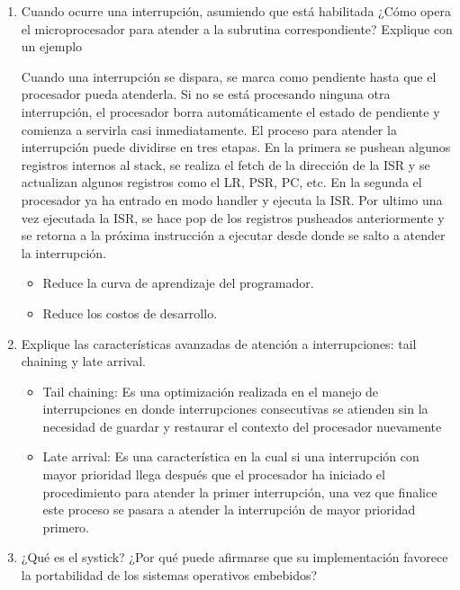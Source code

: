 \documentclass[12pt, a4paper]{article}
\makeatletter
\newcommand\setItemnumber[1]{\setcounter{enum\romannumeral\@enumdepth}{\numexpr#1-1\relax}}
\makeatother
\begin{document}
\begin{enumerate}
    \setItemnumber{15}
    \item Cuando ocurre una interrupción, asumiendo que está habilitada ¿Cómo opera el 
    microprocesador para atender a la subrutina correspondiente? Explique con un ejemplo
    
    Cuando una interrupción se dispara, se marca como pendiente hasta que el procesador pueda atenderla. 
    Si no se está procesando ninguna otra interrupción, el procesador borra automáticamente el estado 
    de pendiente y comienza a servirla casi inmediatamente. El proceso para atender la interrupción puede
    dividirse en tres etapas. En la primera se pushean algunos registros internos al stack, se realiza el 
    fetch de la dirección de la ISR y se actualizan algunos registros como el LR, PSR, PC, etc. En la segunda 
    el procesador ya  ha entrado en modo handler y ejecuta la ISR. Por ultimo una vez ejecutada la ISR, 
    se hace pop de los registros pusheados anteriormente y se retorna a la próxima instrucción a ejecutar desde 
    donde se salto a atender la interrupción.
    
    \begin{itemize}
        \item Reduce la curva de aprendizaje del programador.
        \item Reduce los costos de desarrollo.
    \end{itemize}
    
    \setItemnumber{16}
    \item Explique las características avanzadas de atención a interrupciones: tail chaining y late
    arrival.
    
    \begin{itemize}
        \item Tail chaining: Es una optimización realizada en el manejo de interrupciones en donde 
        interrupciones consecutivas se atienden sin la necesidad de guardar y restaurar el contexto del 
        procesador nuevamente  
        
        \item Late arrival: Es una característica en la cual si una interrupción con mayor prioridad 
        llega después que el procesador ha iniciado el procedimiento para atender la primer interrupción,
        una vez que finalice este proceso se pasara a atender la interrupción de mayor prioridad primero.
    \end{itemize}
    
    
    \setItemnumber{17}
    \item ¿Qué es el systick? ¿Por qué puede afirmarse que su implementación favorece la portabilidad 
    de los sistemas operativos embebidos?
    

\end{enumerate}
\end{document}
